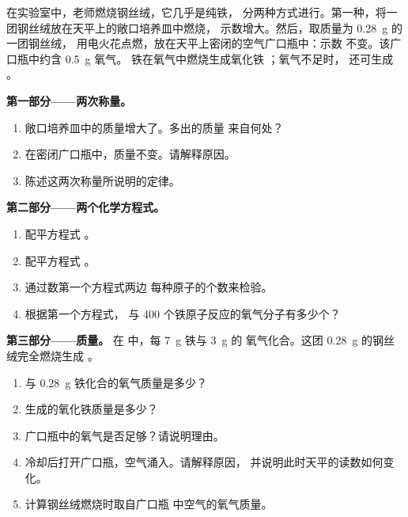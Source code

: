 \begin{problem}
\label{pb:g8:balanced-equations:1}
在实验室中，老师燃烧钢丝绒，它几乎是纯铁，
分两种方式进行。第一种，将一团钢丝绒放在天平上的敞口培养皿中燃烧，
示数增大。然后，取质量为 \qty{0.28}{g} 的一团钢丝绒，
用电火花点燃，放在天平上密闭的空气广口瓶中：示数
不变。该广口瓶中约含 \qty{0.5}{g} 氧气。
铁在氧气中燃烧生成氧化铁 ；氧气不足时，
还可生成 。

\medskip
\noindent\textbf{第一部分——两次称量。}
\begin{enumerate}
  \item 敞口培养皿中的质量增大了。多出的质量
        来自何处？
  \item 在密闭广口瓶中，质量不变。请解释原因。
  \item 陈述这两次称量所说明的定律。
\end{enumerate}

\medskip
\noindent\textbf{第二部分——两个化学方程式。}
\begin{enumerate}[resume]
  \item 配平方程式 。 %
  \item 配平方程式 。 %
  \item 通过数第一个方程式两边
        每种原子的个数来检验。
  \item 根据第一个方程式，
        与 400 个铁原子反应的氧气分子有多少个？
\end{enumerate}

\medskip
\noindent\textbf{第三部分——质量。}
在  中，每 \qty{7}{g} 铁与 \qty{3}{g} 的
氧气化合。这团 \qty{0.28}{g} 的钢丝绒完全燃烧生成 。
\begin{enumerate}[resume]
  \item 与 \qty{0.28}{g} 铁化合的氧气质量是多少？
  \item 生成的氧化铁质量是多少？
  \item 广口瓶中的氧气是否足够？请说明理由。
  \item 冷却后打开广口瓶，空气涌入。请解释原因，
        并说明此时天平的读数如何变化。
  \item 计算钢丝绒燃烧时取自广口瓶
        中空气的氧气质量。
\end{enumerate}
\end{problem}
